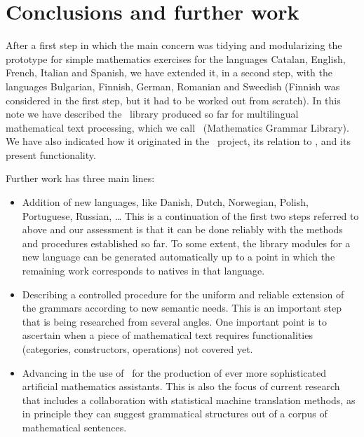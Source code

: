 \documentclass[adraft,copyright,creativecommons]{eptcs}
\begin{document}


\section{Conclusions and further work}

After a first step in which the main concern was tidying and modularizing
the \webalt{} prototype for simple mathematics exercises for the languages
Catalan,
English,
French,
Italian and
Spanish,
we have extended it, in a second step, with the languages
Bulgarian, Finnish,
German, Romanian and Sweedish
(Finnish was considered in the first step, but it had to be worked out from
scratch).
In this note we have described the \GF\ library produced so far for
multilingual mathematical text processing, which we call
\MGL\ (Mathematics Grammar Library). We have also indicated how it
originated in the \webalt\ project, its relation to \GF, and its
present functionality.

Further work has three main lines:
\begin{itemize}
\item
Addition of new languages,
like Danish, Dutch, Norwegian, Polish, Portuguese, Russian, \ldots
This is a continuation of the first two steps referred to above and
our assessment is that it can be done reliably with the methods and
procedures established so far. To some extent, the library modules for a
new language can be generated automatically up to a point in which the
remaining work corresponds to natives in that language.
\item
Describing a controlled procedure for the uniform and reliable extension
of the grammars according to new semantic needs. This is an important step
that is being researched from several angles. One important point is to
ascertain when a piece of mathematical text requires functionalities
(categories, constructors, operations) not covered yet.
\item
Advancing in the use of \MGL\ for the production of ever more
sophisticated artificial mathematics assistants. This is also the focus of
current research that includes a collaboration with statistical machine
translation methods, as in principle they can suggest grammatical structures
out of a corpus of mathematical sentences.
\end{itemize}


\nocite{*}

%

\end{document}
